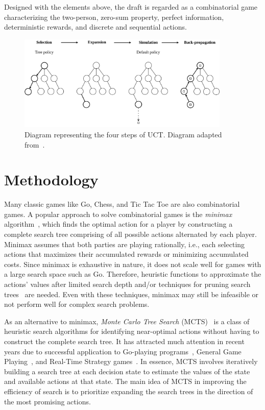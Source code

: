 Designed with the elements above, the draft is regarded as a combinatorial game characterizing the two-person, zero-sum property, perfect information, deterministic rewards, and discrete and sequential actions. 


\begin{figure}
\centering
\includegraphics[width=0.9\textwidth]{Figures/mcts_plot_my2.png}
\caption{Diagram representing the four steps of UCT. Diagram adapted from~\cite{browne2012survey}.}
\label{fig:mctsplot}
\end{figure}



\section{Methodology}\label{sec:mcts}
Many classic games like Go, Chess, and Tic Tac Toe are also combinatorial games. A popular approach to solve combinatorial games is the \textit{minimax} algorithm~\cite{knuth1975analysis}, which finds the optimal action for a player by constructing a complete search tree comprising of all possible actions alternated by each player. Minimax assumes that both parties are playing rationally, i.e., each selecting actions that maximizes their accumulated rewards or minimizing accumulated costs. Since minimax is exhaustive in nature, it does not scale well for games with a large search space such as Go. Therefore, heuristic functions to approximate the actions' values after limited search depth and/or techniques for pruning search trees~\cite{knuth1975analysis} are needed. Even with these techniques, minimax may still be infeasible or not perform well for complex search problems. 


As an alternative to minimax, \textit{Monte Carlo Tree Search} (MCTS)~\cite{coulom2006efficient,kocsis2006bandit,nguyen2014bootstrapping} is a class of heuristic search algorithms for identifying near-optimal actions without having to construct the complete search tree. It has attracted much attention in recent years due to successful application to Go-playing programs~\cite{silver2016mastering,silver2017mastering}, General Game Playing~\cite{finnsson2008simulation}, and Real-Time Strategy games~\cite{balla2009uct}. In essence, MCTS involves iteratively building a search tree at each decision state to estimate the values of the state and available actions at that state. The main idea of MCTS in improving the efficiency of search is to prioritize expanding the search trees in the direction of the most promising actions.

